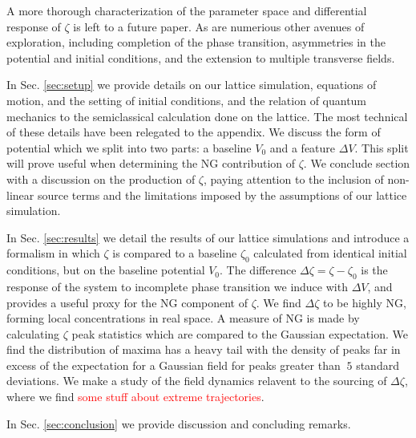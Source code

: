 A more thorough characterization of the parameter space and differential response of $\zeta$ is left to a future paper. As are numerious other avenues of exploration, including completion of the phase transition, asymmetries in the potential and initial conditions, and the extension to multiple transverse fields.

In Sec. \ref{sec:setup} we provide details on our lattice simulation, equations of motion, and the setting of initial conditions, and the relation of quantum mechanics to the semiclassical calculation done on the lattice. The most technical of these details have been relegated to the appendix. We discuss the form of potential which we split into two parts: a baseline $V_0$ and a feature $\Delta V$. This split will prove useful when determining the NG contribution of $\zeta$. We conclude section with a discussion on the production of $\zeta$, paying attention to the inclusion of non-linear source terms and the limitations imposed by the assumptions of our lattice simulation.

In Sec. \ref{sec:results} we detail the results of our lattice simulations and introduce a formalism in which $\zeta$ is compared to a baseline $\zeta_0$ calculated from identical initial conditions, but on the baseline potential $V_0$. The difference $\Delta\zeta=\zeta-\zeta_0$ is the response of the system to incomplete phase transition we induce with $\Delta V$, and provides a useful proxy for the NG component of $\zeta$. We find $\Delta\zeta$ to be highly NG, forming local concentrations in real space. A measure of NG is made by calculating $\zeta$ peak statistics which are compared to the Gaussian expectation. We find the distribution of maxima has a heavy tail with the density of peaks far in excess of the expectation for a Gaussian field for peaks greater than $~5$ standard deviations. We make a study of the field dynamics relavent to the sourcing of $\Delta\zeta$, where we find \textcolor{red}{some stuff about extreme trajectories}.

In Sec. \ref{sec:conclusion} we provide discussion and concluding remarks.
